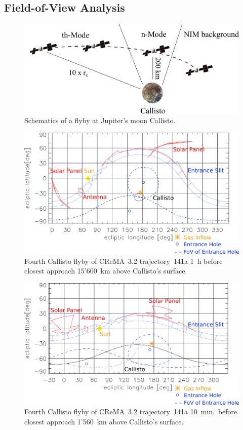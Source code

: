 	\subsection{Field-of-View Analysis}\label{subsubsec:Calfly}
	\begin{figure}[h!]
		\centering
		\includegraphics[width=.8\textwidth]{Bilder/Callisto_flyby_schematic.png}
		\caption{Schematics of a flyby at Jupiter's moon Callisto.}
		\label{fig:CalflybySchem}
	\end{figure}
	\begin{figure}[h!]
		\centering
		\includegraphics[width = .7\textwidth]{Bilder/NIM_pointing_2031JAN15185200.png}
		\caption{Fourth Callisto flyby of CReMA~3.2 trajectory~141a \cite{SOC_Crema3p2} 1~h before closest approach 15'600~km above Callisto's surface.}
		\label{fig:FlybyCal1852}
	\end{figure}
	\begin{figure}[h!]
		\centering
		\includegraphics[width = .7\textwidth]{Bilder/NIM_pointing_2031JAN15194200.png}
		\caption{Fourth Callisto flyby of CReMA~3.2 trajectory~141a \cite{SOC_Crema3p2} 10~min.\ before closest approach 1'560~km above Callisto's surface.}
		\label{fig:FlybyCal1942}
	\end{figure}
